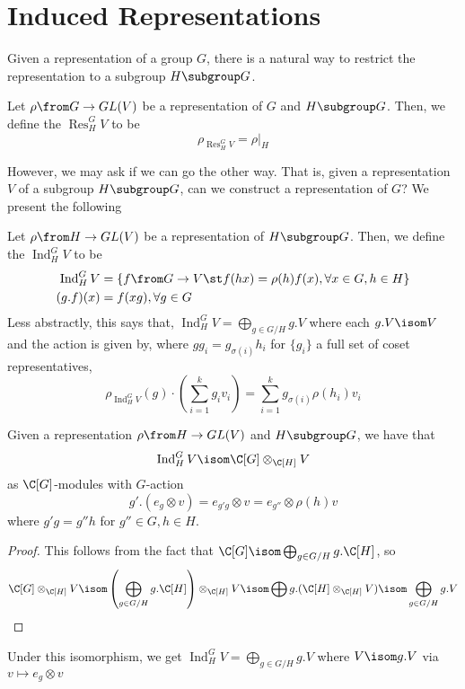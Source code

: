 \documentclass[11pt,leqno,oneside]{amsbook}
\newcommand{\Res}{\operatorname{Res}}
\newcommand{\Ind}{\operatorname{Ind}}
\numberwithin{thm}{section}
\begin{document}
\section{Induced Representations}
Given a representation of a group \(G\), there is a natural way to
restrict the representation to a subgroup \(H \subgroup G\).
\begin{defn}
  Let \(\rho \from G \to GL(V)\) be a representation of \(G\) and \(H \subgroup G\). Then,
  we define the  \(\Res_H^G V\) to be \[
    \rho_{\Res_H^G V} = \rho|_H
  \]
\end{defn}
However, we may ask if we can go the other way. That is, given a
representation \(V\) of a subgroup \(H \subgroup G\), can we construct
a representation of \(G\)? We present the following
\begin{defn}
  Let \(\rho \from H \to GL(V)\) be a representation of \(H \subgroup
  G\). Then, we define the  \(\Ind_H^G V\)
  to be
  \begin{align*}
    \Ind_H^G V & = \{f \from G \to V \st f(hx) = \rho(h)f(x), \forall x
    \in G, h \in H\} \\
    (g.f)(x) & = f(xg), \forall g \in G
  \end{align*}
  Less abstractly, this says that, \(\Ind_H^G V = \bigoplus_{g \in G/H}
  g.V\) where each \(g.V \isom V\) and the action is given by,
  where \(gg_i = g_{\sigma(i)}h_i\) for \(\{g_i\}\) a full set of
  coset representatives, \[
    \rho_{\Ind_H^G V}(g) \cdot \left( \sum_{i = 1}^k g_i v_i \right)
    = \sum_{i=1}^k g_{\sigma(i)} \rho(h_i) v_i
  \]
\end{defn}
\begin{prop}\label{ind-is-tensor}
  Given a representation \(\rho \from H \to GL(V)\) and \(H \subgroup
  G\), we have that \[
    \Ind_H^G V \isom \C[G] \otimes_{\C[H]} V
  \]
  as \(\C[G]\)-modules with \(G\)-action \[
    g'.(e_g \otimes v) = e_{g'g} \otimes v = e_{g''} \otimes \rho(h) v
  \]
  where \(g'g = g''h\) for \(g'' \in G, h \in H\).
\end{prop}
\begin{proof}
  This follows from the fact that \(\C[G] \isom \bigoplus_{g \in G/H}
  g.\C[H]\), so \[
    \C[G] \otimes_{\C[H]} V \isom \left( \bigoplus_{g \in G/H} g.\C[H]
    \right) \otimes_{\C[H]} V \isom \bigoplus g.(\C[H] \otimes_{\C[H]}
    V) \isom \bigoplus_{g \in G/H} g.V
  \]
\end{proof}
\begin{rmk}
  Under this isomorphism, we get \(\Ind_H^G V = \bigoplus_{g \in G/H}
  g.V\) where \(V \isom g.V\) via \(v \mapsto e_g \otimes v\)
\end{rmk}
\end{document}
